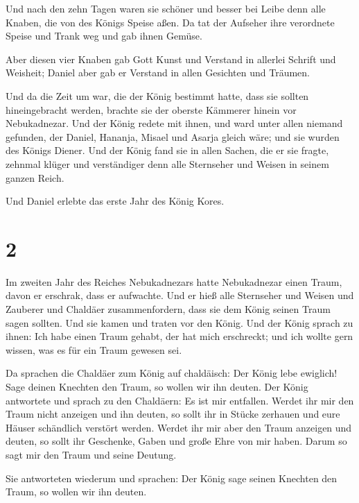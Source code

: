  Und nach den zehn Tagen waren sie schöner und besser bei
Leibe denn alle Knaben, die von des Königs Speise aßen. 
Da tat der Aufseher ihre verordnete Speise und Trank weg und gab ihnen
Gemüse.

 Aber diesen vier Knaben gab Gott Kunst und Verstand in
allerlei Schrift und Weisheit; Daniel aber gab er Verstand in allen
Gesichten und Träumen.

 Und da die Zeit um war, die der König bestimmt hatte,
dass sie sollten hineingebracht werden, brachte sie der oberste Kämmerer
hinein vor Nebukadnezar.  Und der König redete mit ihnen,
und ward unter allen niemand gefunden, der Daniel, Hananja, Misael und
Asarja gleich wäre; und sie wurden des Königs Diener. 
Und der König fand sie in allen Sachen, die er sie fragte, zehnmal
klüger und verständiger denn alle Sternseher und Weisen in seinem ganzen
Reich.

 Und Daniel erlebte das erste Jahr des König Kores.

\hypertarget{section-1}{%
\section{2}\label{section-1}}

 Im zweiten Jahr des Reiches Nebukadnezars hatte
Nebukadnezar einen Traum, davon er erschrak, dass er aufwachte.
 Und er hieß alle Sternseher und Weisen und Zauberer und
Chaldäer zusammenfordern, dass sie dem König seinen Traum sagen sollten.
Und sie kamen und traten vor den König.  Und der König
sprach zu ihnen: Ich habe einen Traum gehabt, der hat mich erschreckt;
und ich wollte gern wissen, was es für ein Traum gewesen sei.

 Da sprachen die Chaldäer zum König auf chaldäisch: Der
König lebe ewiglich! Sage deinen Knechten den Traum, so wollen wir ihn
deuten.  Der König antwortete und sprach zu den Chaldäern:
Es ist mir entfallen. Werdet ihr mir den Traum nicht anzeigen und ihn
deuten, so sollt ihr in Stücke zerhauen und eure Häuser schändlich
verstört werden.  Werdet ihr mir aber den Traum anzeigen
und deuten, so sollt ihr Geschenke, Gaben und große Ehre von mir haben.
Darum so sagt mir den Traum und seine Deutung.

 Sie antworteten wiederum und sprachen: Der König sage
seinen Knechten den Traum, so wollen wir ihn deuten.

